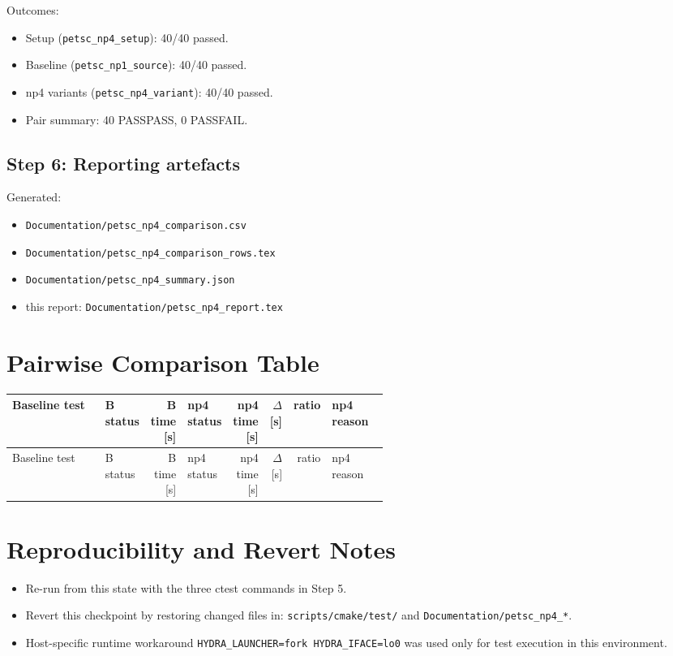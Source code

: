 \documentclass[a4paper,11pt]{article}
\begin{document}
Outcomes:
\begin{itemize}
\item Setup (\texttt{petsc\_np4\_setup}): 40/40 passed.
\item Baseline (\texttt{petsc\_np1\_source}): 40/40 passed.
\item np4 variants (\texttt{petsc\_np4\_variant}): 40/40 passed.
\item Pair summary: 40 PASS\textrightarrow{}PASS, 0 PASS\textrightarrow{}FAIL.
\end{itemize}

\subsection*{Step 6: Reporting artefacts}
Generated:
\begin{itemize}
\item \texttt{Documentation/petsc\_np4\_comparison.csv}
\item \texttt{Documentation/petsc\_np4\_comparison\_rows.tex}
\item \texttt{Documentation/petsc\_np4\_summary.json}
\item this report: \texttt{Documentation/petsc\_np4\_report.tex}
\end{itemize}

\section*{Pairwise Comparison Table}
\footnotesize
\setlength{\LTleft}{0pt}
\setlength{\LTright}{0pt}
\begin{longtable}{p{0.36\linewidth} l r l r r r p{0.18\linewidth}}
\toprule
Baseline test & B status & B time [s] & np4 status & np4 time [s] & $\Delta$ [s] & ratio & np4 reason \\
\midrule
\endfirsthead
\toprule
Baseline test & B status & B time [s] & np4 status & np4 time [s] & $\Delta$ [s] & ratio & np4 reason \\
\midrule
\endhead

\bottomrule
\end{longtable}
\normalsize

\section*{Reproducibility and Revert Notes}
\begin{itemize}
\item Re-run from this state with the three ctest commands in Step 5.
\item Revert this checkpoint by restoring changed files in:
\texttt{scripts/cmake/test/} and \texttt{Documentation/petsc\_np4\_*}.
\item Host-specific runtime workaround \texttt{HYDRA\_LAUNCHER=fork HYDRA\_IFACE=lo0}
was used only for test execution in this environment.
\end{itemize}
\end{document}
